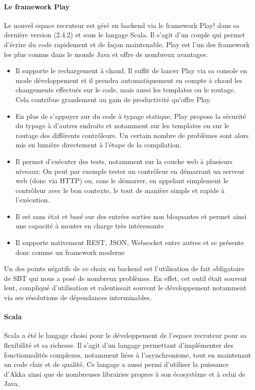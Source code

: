 \paragraph{Le framework Play}
Le nouvel espace recruteur est géré en backend via le framework Play! dans sa dernière version (2.4.2) et sous le langage Scala.
Il s'agit d'un couple qui permet d'écrire du code rapidement et de façon maintenable.
Play est l'un des framework les plus connus dans le monde Java et offre de nombreux avantages:
\begin{itemize}
  \item Il supporte le rechargement à chaud.
  Il suffit de lancer Play via sa console en mode développement et il prendra automatiquement en compte à chaud les changements effectués sur le code, mais aussi les templates ou le routage.
  Cela contribue grandement au gain de productivité qu'offre Play.
  \item En plus de s’appuyer sur du code à typage statique, Play propose la sécurité du typage à d’autres endroits et notamment sur les templates ou sur le routage des différents contrôleurs.
  Un certain nombre de problèmes sont alors mis en lumière directement à l’étape de la compilation.
  \item Il permet d'exécuter des tests, notamment sur la couche web à plusieurs niveaux:
  On peut par exemple tester un contrôleur en démarrant un serveur web (donc via HTTP) ou, sans le démarrer, en appelant simplement le contrôleur avec le bon contexte, le tout de manière simple et rapide à l’exécution.
  \item Il est sans état et basé sur des entrées sorties non bloquantes et permet ainsi une capacité à monter en charge très intéressante
  \item Il supporte nativement REST, JSON, Websocket entre autres et se présente donc comme un framework moderne
\end{itemize}
Un des points négatifs de ce choix en backend est l'utilisation de fait obligatoire de SBT qui nous a posé de nombreux problèmes.
En effet, cet outil était souvent lent, compliqué d'utilisation et ralentissait souvent le développement notamment via ses résolutions de dépendances interminables.
\paragraph{Scala}
Scala a été le langage choisi pour le développement de l'espace recruteur pour sa flexibilité et sa richesse.
Il s'agit d'un langage permettant d'implémenter des fonctionnalités complexes, notamment liées à l'asynchronisme, tout en maintenant un code clair et de qualité.
Ce langage a aussi permi d'utiliser la puissance d'Akka ainsi que de nombreuses librairies propres à son écosystème et à celui de Java.

